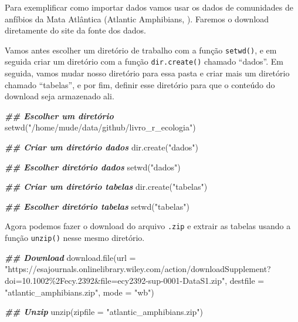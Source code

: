 \documentclass[
]{book}
\newenvironment{Shaded}{\begin{snugshade}}{\end{snugshade}}
\newcommand{\AttributeTok}[1]{\textcolor[rgb]{0.61,0.61,0.61}{#1}}
\newcommand{\DocumentationTok}[1]{\textcolor[rgb]{0.37,0.37,0.37}{\textbf{\textit{#1}}}}
\newcommand{\FunctionTok}[1]{\textcolor[rgb]{0,0,0}{#1}}
\newcommand{\NormalTok}[1]{#1}
\newcommand{\StringTok}[1]{\textcolor[rgb]{0.5,0.5,0.5}{#1}}
\begin{document}
Para exemplificar como importar dados vamos usar os dados de comunidades de anfíbios da Mata Atlântica (Atlantic Amphibians, \citet{vancine2018}). Faremos o download diretamente do site da fonte dos dados.

Vamos antes escolher um diretório de trabalho com a função \texttt{setwd()}, e em seguida criar um diretório com a função \texttt{dir.create()} chamado ``dados''. Em seguida, vamos mudar nosso diretório para essa pasta e criar mais um diretório chamado ``tabelas'', e por fim, definir esse diretório para que o conteúdo do download seja armazenado ali.

\begin{Shaded}
\begin{Highlighting}[]
\DocumentationTok{\#\# Escolher um diretório}
\FunctionTok{setwd}\NormalTok{(}\StringTok{"/home/mude/data/github/livro\_r\_ecologia"}\NormalTok{)}

\DocumentationTok{\#\# Criar um diretório \textquotesingle{}dados\textquotesingle{}}
\FunctionTok{dir.create}\NormalTok{(}\StringTok{"dados"}\NormalTok{)}

\DocumentationTok{\#\# Escolher diretório \textquotesingle{}dados\textquotesingle{}}
\FunctionTok{setwd}\NormalTok{(}\StringTok{"dados"}\NormalTok{)}

\DocumentationTok{\#\# Criar um diretório \textquotesingle{}tabelas\textquotesingle{}}
\FunctionTok{dir.create}\NormalTok{(}\StringTok{"tabelas"}\NormalTok{)}

\DocumentationTok{\#\# Escolher diretório \textquotesingle{}tabelas\textquotesingle{}}
\FunctionTok{setwd}\NormalTok{(}\StringTok{"tabelas"}\NormalTok{)}
\end{Highlighting}
\end{Shaded}

Agora podemos fazer o download do arquivo \texttt{.zip} e extrair as tabelas usando a função \texttt{unzip()} nesse mesmo diretório.

\begin{Shaded}
\begin{Highlighting}[]
\DocumentationTok{\#\# Download}
\FunctionTok{download.file}\NormalTok{(}\AttributeTok{url =} \StringTok{"https://esajournals.onlinelibrary.wiley.com/action/downloadSupplement?doi=10.1002\%2Fecy.2392\&file=ecy2392{-}sup{-}0001{-}DataS1.zip"}\NormalTok{,}
              \AttributeTok{destfile =} \StringTok{"atlantic\_amphibians.zip"}\NormalTok{, }\AttributeTok{mode =} \StringTok{"wb"}\NormalTok{)}

\DocumentationTok{\#\# Unzip}
\FunctionTok{unzip}\NormalTok{(}\AttributeTok{zipfile =} \StringTok{"atlantic\_amphibians.zip"}\NormalTok{)}
\end{Highlighting}
\end{Shaded}
\end{document}
